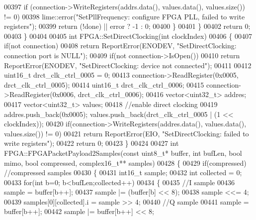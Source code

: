 \begin{DoxyCode}
{{{{{00397             \textcolor{keywordflow}{if} (connection->WriteRegisters(addrs.data(), values.data(), values.size()) != 0)
00398                 lime::error(\textcolor{stringliteral}{"SetPllFrequency: configure FPGA PLL, failed to write registers"});
00399             \textcolor{keywordflow}{return} (!done) || error ? -1 : 0;
00400         \}
00401     \}
00402     \textcolor{keywordflow}{return} 0;
00403 \}
00404 
00405 \textcolor{keywordtype}{int} FPGA::SetDirectClocking(\textcolor{keywordtype}{int} clockIndex)
00406 \{
00407     \textcolor{keywordflow}{if}(not connection)
00408         \textcolor{keywordflow}{return} ReportError(ENODEV, \textcolor{stringliteral}{"SetDirectClocking: connection port is NULL"});
00409     \textcolor{keywordflow}{if}(not connection->IsOpen())
00410         \textcolor{keywordflow}{return} ReportError(ENODEV, \textcolor{stringliteral}{"SetDirectClocking: device not connected"});
00411 
00412     uint16\_t drct\_clk\_ctrl\_0005 = 0;
00413     connection->ReadRegister(0x0005, drct\_clk\_ctrl\_0005);
00414     uint16\_t drct\_clk\_ctrl\_0006;
00415     connection->ReadRegister(0x0006, drct\_clk\_ctrl\_0006);
00416     vector<uint32\_t> addres;
00417     vector<uint32\_t> values;
00418     \textcolor{comment}{//enable direct clocking}
00419     addres.push\_back(0x0005); values.push\_back(drct\_clk\_ctrl\_0005 | (1 << clockIndex));
00420     \textcolor{keywordflow}{if}(connection->WriteRegisters(addres.data(), values.data(), values.size()) != 0)
00421         \textcolor{keywordflow}{return} ReportError(EIO, \textcolor{stringliteral}{"SetDirectClocking: failed to write registers"});
00422     \textcolor{keywordflow}{return} 0;
00423 \}
00424 
00427 \textcolor{keywordtype}{int} FPGA::FPGAPacketPayload2Samples(\textcolor{keyword}{const} uint8\_t* buffer, \textcolor{keywordtype}{int} bufLen, \textcolor{keywordtype}{bool} mimo, \textcolor{keywordtype}{bool} compressed, 
      complex16_t** samples)
00428 \{
00429     \textcolor{keywordflow}{if}(compressed) \textcolor{comment}{//compressed samples}
00430     \{
00431         int16\_t sample;
00432         \textcolor{keywordtype}{int} collected = 0;
00433         \textcolor{keywordflow}{for}(\textcolor{keywordtype}{int} b=0; b<bufLen;collected++)
00434         \{
00435             \textcolor{comment}{//I sample}
00436             sample = buffer[b++];
00437             sample |= (buffer[b] << 8);
00438             sample <<= 4;
00439             samples[0][collected].i = sample >> 4;
00440             \textcolor{comment}{//Q sample}
00441             sample =  buffer[b++];
00442             sample |= buffer[b++] << 8;
}}}}}
\end{DoxyCode}
